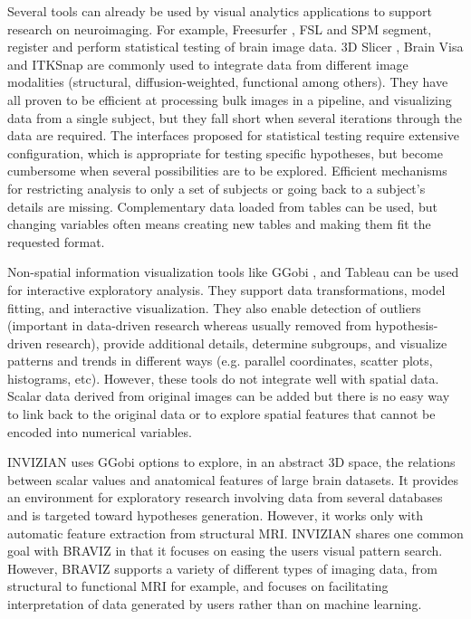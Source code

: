 \documentclass[twocolumn]{svjour3}
\begin{document}
Several tools can already be used by visual analytics applications to support research on neuroimaging. For example, Freesurfer \cite{fischl_freesurfer_2012}, FSL \cite{jenkinson_fsl_2012} and SPM \cite{friston_statistical_2006} segment, register and perform statistical testing of brain image data. 3D Slicer \cite{fedorov_3d_2012}, Brain Visa \cite{cointepas_brainvisa:_2001} and ITKSnap \cite{yushkevich_user-guided_2006} are commonly used to integrate data from different image modalities (structural, diffusion-weighted, functional among others). They have all proven to be efficient at processing bulk images in a pipeline, and visualizing data from a single subject, but they fall short when several iterations through the data are required. The interfaces proposed for statistical testing require extensive configuration, which is appropriate for testing specific hypotheses, but become cumbersome when several possibilities are to be explored. Efficient mechanisms for restricting analysis to only a set of subjects or going back to a subject's details are missing. Complementary data loaded from tables can be used, but changing variables often means creating new tables and making them fit the requested format.


Non-spatial information visualization tools like GGobi \cite{cook_interactive_2007}, and Tableau\cite{hanrahan_tableau_2003} can be used for interactive exploratory analysis. They support data transformations, model fitting, and interactive visualization. They also enable  detection of outliers (important in data-driven research whereas usually removed from hypothesis-driven research), provide additional details, determine subgroups, and visualize patterns and trends in different ways (e.g. parallel coordinates, scatter plots, histograms, etc). However, these tools do not integrate well with spatial data. Scalar data derived from original images can be added but there is no easy way to link back to the original data or to explore spatial features that cannot be encoded into numerical variables.

INVIZIAN \cite{bowman_query-based_2011,bowman_feature-similarity_2012,bowman_visual_2012} uses GGobi options to explore, in an abstract 3D space, the relations between scalar values and anatomical features of large brain datasets. It provides an environment for exploratory research involving data from several databases and is targeted toward hypotheses generation. However, it works only with automatic feature extraction from structural MRI. INVIZIAN shares one common goal with BRAVIZ in that it focuses on easing the users visual pattern search. However, BRAVIZ supports a variety of different types of imaging data, from structural to functional MRI for example, and focuses on facilitating interpretation of data generated by users rather than on machine learning.
\end{document}
